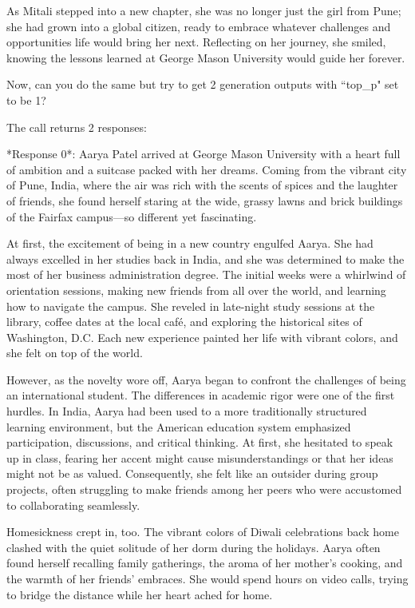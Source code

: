 \documentclass[11pt,addpoints,answers]{exam}
\begin{document}
\begin{questions}
\begin{tcolorbox}[fit,height=18cm, width=16cm, blank, borderline={1pt}{-2pt},nobeforeafter]
As Mitali stepped into a new chapter, she was no longer just the girl from Pune; she had grown into a global citizen, ready to embrace whatever challenges and opportunities life would bring her next. Reflecting on her journey, she smiled, knowing the lessons learned at George Mason University would guide her forever.
    \end{tcolorbox}

    \question[5] Now, can you do the same but try to get 2 generation outputs with ``top\_p" set to be 1?
    
    \begin{tcolorbox}[fit,height=22cm, width=16cm, blank, borderline={1pt}{-2pt},nobeforeafter]
    The call returns 2 responses:

*Response 0*:  Aarya Patel arrived at George Mason University with a heart full of ambition and a suitcase packed with her dreams. Coming from the vibrant city of Pune, India, where the air was rich with the scents of spices and the laughter of friends, she found herself staring at the wide, grassy lawns and brick buildings of the Fairfax campus—so different yet fascinating.

At first, the excitement of being in a new country engulfed Aarya. She had always excelled in her studies back in India, and she was determined to make the most of her business administration degree. The initial weeks were a whirlwind of orientation sessions, making new friends from all over the world, and learning how to navigate the campus. She reveled in late-night study sessions at the library, coffee dates at the local café, and exploring the historical sites of Washington, D.C. Each new experience painted her life with vibrant colors, and she felt on top of the world.

However, as the novelty wore off, Aarya began to confront the challenges of being an international student. The differences in academic rigor were one of the first hurdles. In India, Aarya had been used to a more traditionally structured learning environment, but the American education system emphasized participation, discussions, and critical thinking. At first, she hesitated to speak up in class, fearing her accent might cause misunderstandings or that her ideas might not be as valued. Consequently, she felt like an outsider during group projects, often struggling to make friends among her peers who were accustomed to collaborating seamlessly.

Homesickness crept in, too. The vibrant colors of Diwali celebrations back home clashed with the quiet solitude of her dorm during the holidays. Aarya often found herself recalling family gatherings, the aroma of her mother's cooking, and the warmth of her friends' embraces. She would spend hours on video calls, trying to bridge the distance while her heart ached for home.


\end{tcolorbox}
\end{questions}
\end{document}
